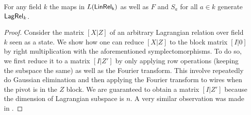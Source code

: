 \begin{theorem}
\label{theorem:generators}
For any field $k$ the maps in $L(\sf LinRel_k)$ as well as $F$ and $S_a$ for all $a \in k$ generate $\mathsf{Lag}\mathsf{Rel}_k$.
\end{theorem}

\begin{proof}
Consider the matrix $[X|Z]$ of an arbitrary Lagrangian relation over field $k$ seen as a state.
%
We show how one can reduce $[X|Z]$ to the block matrix $[I|0]$ by right multiplication with the aforementioned symplectomorphisms.
To do so, we first reduce it to a matrix $[I|Z']$
by only applying row operations (keeping the subspace the same) as well as the Fourier transform.
This involve repeatedly do Gaussian elimination and then applying the Fourier transform to wires when the pivot is in the $Z$ block.
We are guaranteed to obtain a matrix $[I|Z']$ because the dimension of Lagrangian subspace is $n$.
A very similar observation was made in \cite[Lem. 6]{aaronson}.


\end{proof}
